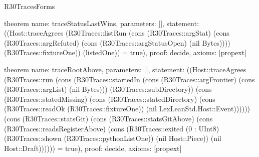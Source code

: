 \begin{lexlean}{R30TracesForms}
\begin{semanticmodule}
theorem{
  name: traceStatusLastWins,
  parameters: [],
  statement: ((Host::traceAgrees (R30Traces::listRun (cons (R30Traces::argStat) (cons (R30Traces::argRefuted) (cons (R30Traces::argStatusOpen) (nil Bytes)))) (R30Traces::fixtureOne)) (listedOne)) = true),
  proof: decide{},
  axioms: [propext]
}

theorem{
  name: traceRootAbove,
  parameters: [],
  statement: ((Host::traceAgrees (R30Traces::run (cons (R30Traces::startedIn (cons (R30Traces::argFrontier) (cons (R30Traces::argList) (nil Bytes))) (R30Traces::subDirectory)) (cons (R30Traces::statedMissing) (cons (R30Traces::statedDirectory) (cons (R30Traces::readOk (R30Traces::fixtureOne)) (nil LexLeanStd.Host::Event)))))) (cons (R30Traces::statsGit) (cons (R30Traces::statsGitAbove) (cons (R30Traces::readsRegisterAbove) (cons (R30Traces::exited (0 : UInt8) (R30Traces::shown (R30Traces::pythonListOne)) (nil Host::Piece)) (nil Host::Draft)))))) = true),
  proof: decide{},
  axioms: [propext]
}
\end{semanticmodule}
\end{lexlean}
